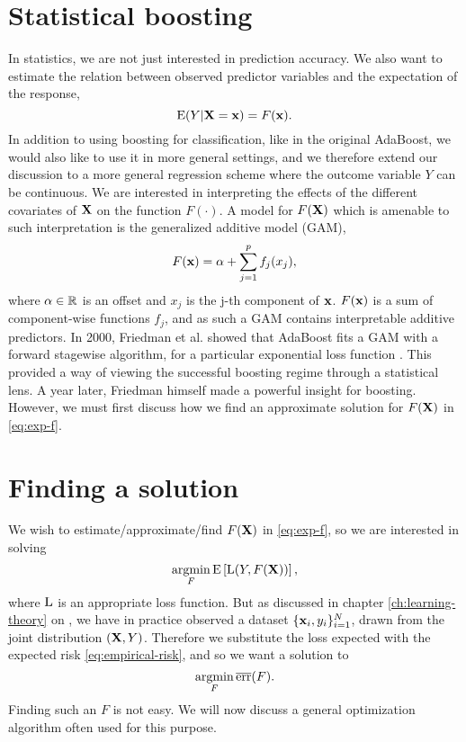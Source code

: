 \section{Statistical boosting}\label{sec:sboost}
In statistics, we are not just interested in prediction accuracy. We also want to estimate the relation between observed predictor variables and the expectation of the response,
\begin{equation}\label{eq:exp-f}
    \operatorname{E}(Y|\mathbf{X}=\mathbf{x})=F(\mathbf{x}).
\end{equation}
In addition to using boosting for classification, like in the original AdaBoost, we would also like to use it in more general settings, and we therefore extend our discussion to a more general regression scheme where the outcome variable $Y$ can be continuous. We are interested in interpreting the effects of the different covariates of $\mathbf{X}$ on the function $F(\cdot)$. A model for $F(\mathbf{X})$ which is amenable to such interpretation is the generalized additive model (GAM),
\begin{equation}\label{eq:gam}
    F(\mathbf{x})=\alpha+\sum_{j=1}^pf_j(x_j),
\end{equation}
where $\alpha\in\mathbb{R}$ is an offset and $x_j$ is the j-th component of $\mathbf{x}$. $F(\mathbf{x})$ is a sum of component-wise functions $f_j$, and as such a GAM contains interpretable additive predictors. In 2000, Friedman et al. showed that AdaBoost fits a GAM with a forward stagewise algorithm, for a particular exponential loss function \citep{friedman2000}. This provided a way of viewing the successful boosting regime through a statistical lens. A year later, Friedman himself made a powerful insight for boosting. However, we must first discuss how we find an approximate solution for $F(\mathbf{X})$ in \eqref{eq:exp-f}.

\section{Finding a solution}
We wish to estimate/approximate/find $F(\mathbf{X})$ in \eqref{eq:exp-f}, so we are interested in solving
\begin{equation*}
    \operatorname*{argmin}_{F}\operatorname{E}\left[\operatorname{L}(Y,F(\mathbf{X}))\right],
\end{equation*}
where $\operatorname{L}$ is an appropriate loss function. But as discussed in chapter \ref{ch:learning-theory} on , we have in practice observed a dataset $\{\mathbf{x}_i,y_i\}_{i=1}^N$, drawn from the joint distribution $(\mathbf{X},Y)$. Therefore we substitute the loss expected with the expected risk \eqref{eq:empirical-risk}, and so we want a solution to
\begin{equation}\label{eq:argmin-risk}
    \operatorname*{argmin}_{F}\overline{\text{err}}(F).
\end{equation}
Finding such an $F$ is not easy. We will now discuss a general optimization algorithm often used for this purpose.

